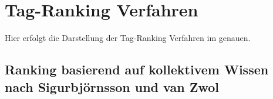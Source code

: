 \section{Tag-Ranking Verfahren} %
\label{sec:tag_ranking_verfahren}
Hier erfolgt die Darstellung der Tag-Ranking Verfahren im genauen.

% 
% 

\subsection{Ranking basierend auf kollektivem Wissen nach Sigurbjörnsson und van Zwol} %
\label{sub:ranking_basierend_auf_kollektivem_wissen_nach_zwol}




